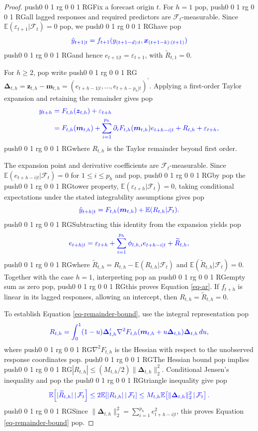 \documentclass[
  american,
  12pt]{article}
\theoremstyle{plain}
\theoremstyle{plain}
\theoremstyle{remark}
\newcommand{\CPTSadd}[1]{\ifmmode\else\leavevmode\fi\pdfcolorstack 0 push{0 0 1 rg 0 0 1 RG}#1\pdfcolorstack 0 pop}
\begin{document}
\begin{proof}
\CPTSadd{Fix a forecast origin \(t\). For \(h=1\)}, \CPTSadd{all lagged responses and
required predictors are \(\mathcal F_t\)-measurable. Since
\(\mathbb E(\varepsilon_{t+1}|\mathcal F_t)=0\)}, we \CPTSadd{have} \[
\CPTSadd{\hat y_{t+1|t}=f_{t+1}(y_{(t+1-d):t},\bm x_{(t+1-k):(t+1)})}
\] \CPTSadd{and hence \(e_{t+1|t}=\varepsilon_{t+1}\), with
\(\widetilde R_{t,1}=0\).

For \(h\geq2\),} write
\CPTSadd{\(\bm\Delta_{t,h}=\bm z_{t,h}-\bm m_{t,h}=(e_{t+h-1|t},\dots,e_{t+h-p_h|t})^{\prime}\).
Applying a first-order Taylor expansion and retaining the remainder
gives} \begin{align*}
\CPTSadd{y_{t+h}}
&\CPTSadd{=F_{t,h}(\bm z_{t,h})+\varepsilon_{t+h}}\\
&\CPTSadd{=F_{t,h}(\bm m_{t,h})
+\sum_{i=1}^{p_h}\partial_iF_{t,h}(\bm m_{t,h})e_{t+h-i|t}
+R_{t,h}+\varepsilon_{t+h},}
\end{align*} \CPTSadd{where \(R_{t,h}\) is the Taylor remainder beyond first
order.

The expansion point and derivative coefficients are
\(\mathcal F_t\)-measurable. Since
\(\mathbb E(e_{t+h-i|t}|\mathcal F_t)=0\) for \(1\leq i\leq p_h\) and},
\CPTSadd{by} the \CPTSadd{tower property, \(\mathbb E(\varepsilon_{t+h}|\mathcal F_t)=0\),
taking conditional expectations under the stated integrability
assumptions gives} \[
\CPTSadd{\hat y_{t+h|t}=F_{t,h}(\bm m_{t,h})+\mathbb E(R_{t,h}|\mathcal F_t).}
\] \CPTSadd{Subtracting this identity from the expansion yields} \[
\CPTSadd{e_{t+h|t}=\varepsilon_{t+h}+\sum_{i=1}^{p_h}\phi_{t,h,i}e_{t+h-i|t}+\widetilde R_{t,h},}
\] \CPTSadd{where \(\widetilde R_{t,h}=R_{t,h}-\mathbb E(R_{t,h}|\mathcal F_t)\)
and \(\mathbb E(\widetilde R_{t,h}|\mathcal F_t)=0\). Together with the
case \(h=1\), interpreting} an \CPTSadd{empty sum as zero}, \CPTSadd{this proves Equation
\eqref{eq-ar}. If \(f_{t+h}\) is linear in its lagged responses,
allowing an intercept, then \(R_{t,h}=\widetilde R_{t,h}=0\).

To establish Equation \eqref{eq-remainder-bound}, use the integral
representation} \[
\CPTSadd{R_{t,h}=\int_0^1(1-u)\bm\Delta_{t,h}^{\prime}
\nabla^2 F_{t,h}(\bm m_{t,h}+u\bm\Delta_{t,h})\bm\Delta_{t,h}\,du,}
\] where \CPTSadd{\(\nabla^2F_{t,h}\) is the Hessian with respect to the
unobserved response coordinates}. \CPTSadd{The Hessian bound} implies
\CPTSadd{\(|R_{t,h}|\leq(M_{t,h}/2)\|\bm\Delta_{t,h}\|_2^2\). Conditional
Jensen's inequality and} the \CPTSadd{triangle inequality give} \[
\CPTSadd{\mathbb E\!\left[|\widetilde R_{t,h}|\,|\,\mathcal F_t\right]
\leq2\mathbb E\!\left[|R_{t,h}|\,|\,\mathcal F_t\right]
\leq M_{t,h}\mathbb E\!\left[\|\bm\Delta_{t,h}\|_2^2\,|\,\mathcal F_t\right].}
\] \CPTSadd{Since \(\|\bm\Delta_{t,h}\|_2^2=\sum_{i=1}^{p_h}e_{t+h-i|t}^2\), this
proves Equation \eqref{eq-remainder-bound}}.
\end{proof}
\end{document}
